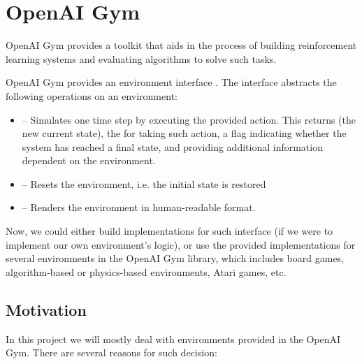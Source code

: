 \section{OpenAI Gym}
\label{openaigym}
OpenAI Gym \parencite{1606.01540} provides a toolkit that aids in the process of building reinforcement learning systems and evaluating algorithms to solve such tasks.

OpenAI Gym provides an environment interface . The interface abstracts the following operations on an environment:

\begin{itemize}
	\item {} -- Simulates one time step by executing the provided action. This returns  (the new current state), the  for taking such action, a flag  indicating whether the system has reached a final state, and  providing additional information dependent on the environment.
	\item {} -- Resets the environment, i.e. the initial state is restored
	\item {} -- Renders the environment in human-readable format.
\end{itemize}

Now, we could either build implementations for such interface (if we were to implement our own environment's logic), or use the provided implementations for several environments in the OpenAI Gym library, which includes board games, algorithm-based or physics-based environments, Atari games, etc.

\subsection{Motivation}
In this project we will mostly deal with environments provided in the OpenAI Gym. There are several reasons for such decision:


